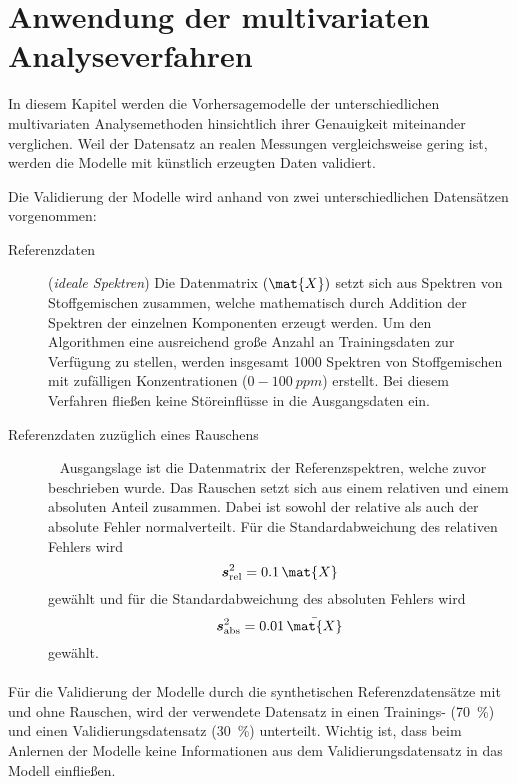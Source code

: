 \section{Anwendung der multivariaten Analyseverfahren}
In diesem Kapitel werden die Vorhersagemodelle der unterschiedlichen multivariaten Analysemethoden hinsichtlich ihrer Genauigkeit miteinander verglichen.
Weil der Datensatz an realen Messungen vergleichsweise gering ist, werden die Modelle mit künstlich erzeugten Daten validiert.

Die Validierung der Modelle wird anhand von zwei unterschiedlichen Datensätzen vorgenommen:
\begin{description}
  \item[Referenzdaten] (\emph{ideale Spektren}) \newline 
    Die Datenmatrix $(\mat{X})$ setzt sich aus Spektren von Stoffgemischen zusammen, welche mathematisch durch Addition der Spektren der einzelnen Komponenten erzeugt werden.
    Um den Algorithmen eine ausreichend große Anzahl an Trainingsdaten zur Verfügung zu stellen, werden insgesamt 1000 Spektren von Stoffgemischen mit zufälligen Konzentrationen ($\num{0} - \SI{100}{ppm}$) erstellt.
    Bei diesem Verfahren fließen keine Störeinflüsse in die Ausgangsdaten ein.
  \item[Referenzdaten zuzüglich eines Rauschens]{\ } \newline 
    Ausgangslage ist die Datenmatrix der Referenzspektren, welche zuvor beschrieben wurde.
    Das Rauschen setzt sich aus einem relativen und einem absoluten Anteil zusammen.
    Dabei ist sowohl der relative als auch der absolute Fehler normalverteilt.
    Für die Standardabweichung des relativen Fehlers wird $$\boldsymbol{s}_\mathrm{rel}^2 = 0.1\, \mat{X}$$ gewählt und für die Standardabweichung des absoluten Fehlers wird $$\boldsymbol{s}_\mathrm{abs}^2 = 0.01\, \bar{\mat{X}}$$ gewählt. 
\end{description}

\paragraph{} Für die Validierung der Modelle durch die synthetischen Referenzdatensätze mit und ohne Rauschen, wird der verwendete Datensatz in einen Trainings- (\SI{70}{\percent}) und einen Validierungsdatensatz (\SI{30}{\percent}) unterteilt.
Wichtig ist, dass beim Anlernen der Modelle keine Informationen aus dem Validierungsdatensatz in das Modell einfließen.

